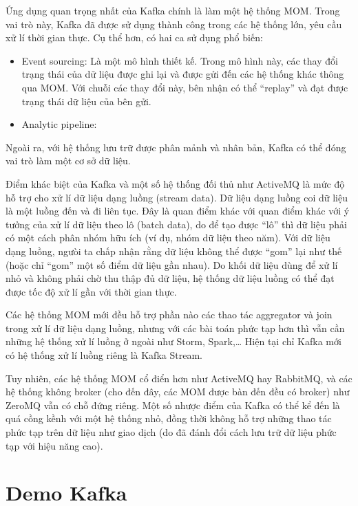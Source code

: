 \documentclass{article}
\begin{document}
Ứng dụng quan trọng nhất của Kafka chính là làm một hệ thống MOM\@. Trong vai
trò này, Kafka đã được sử dụng thành công trong các hệ thống lớn, yêu cầu xử lí
thời gian thực. Cụ thể hơn, có hai ca sử dụng phổ biến:

\begin{itemize}
    \item Event sourcing: Là một mô hình thiết kế. Trong mô hình này, các thay
        đổi trạng thái của dữ liệu được ghi lại và được gửi đến các hệ thống
        khác thông qua MOM\@. Với chuỗi các thay đổi này, bên nhận có thể
        ``replay'' và đạt được trạng thái dữ liệu của bên gửi.
        \item Analytic pipeline:
\end{itemize}

Ngoài ra, với hệ thống lưu trữ được phân mảnh và nhân bản, Kafka có thể đóng vai
trò làm một cơ sở dữ liệu.

Điểm khác biệt của Kafka và một số hệ thống đối thủ như ActiveMQ là mức độ hỗ
trợ cho xử lí dữ liệu dạng luồng (stream data). Dữ liệu dạng luồng coi dữ liệu
là một luồng đến và đi liên tục. Đây là quan điểm khác với quan điểm khác với ý
tưởng của xử lí dữ liệu theo lô (batch data), do để tạo được ``lô'' thì dữ liệu
phải có một cách phân nhóm hữu ích (ví dụ, nhóm dữ liệu theo năm). Với dữ liệu
dạng luồng, ngưòi ta chấp nhận rằng dữ liệu không thể được ``gom'' lại như thế
(hoặc chỉ ``gom'' một số điểm dữ liệu gần nhau). Do khối dữ liệu dùng để xử lí
nhỏ và không phải chờ thu thập đủ dữ liệu, hệ thống dữ liệu luồng có thể đạt
được tốc độ xử lí gần với thời gian thực.

Các hệ thống MOM mới đều hỗ trợ phần nào các thao tác aggregator và join trong
xử lí dữ liệu dạng luồng, nhưng với các bài toán phức tạp hơn thì vẫn cần những
hệ thống xử lí luồng ở ngoài như Storm, Spark,\ldots{} Hiện tại chỉ Kafka mới có
hệ thống xử lí luồng riêng là Kafka Stream.

Tuy nhiên, các hệ thống MOM cổ điển hơn như ActiveMQ hay RabbitMQ, và các hệ
thống không broker (cho đến đây, các MOM được bàn đến đều có broker) như ZeroMQ
vẫn có chỗ đứng riêng. Một số nhược điểm của Kafka có thể kể đến là quá cồng
kềnh với một hệ thống nhỏ, đồng thời không hỗ trợ những thao tác phức tạp trên
dữ liệu như giao dịch (do đã đánh đổi cách lưu trữ dữ liệu phức tạp với hiệu
năng cao).

\section{Demo Kafka}
\end{document}
